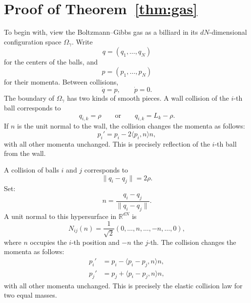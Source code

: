 \documentclass[12pt,reqno]{amsart}
\numberwithin{equation}{section}
\def \R {\mathbb{R}}
\begin{document}
\section{Proof of Theorem~\ref{thm:gas}}
To begin with, view the Boltzmann--Gibbs gas as a billiard in its
\(dN\)-dimensional configuration space \(\Omega_\gamma\). Write
\[
q=(q_1,\ldots,q_N)
\]
for the centers of the balls, and
\[
p=(p_1,\ldots,p_N)
\]
for their momenta. Between collisions,
\[
\dot q=p,\qquad \dot p=0.
\]
The boundary of \(\Omega_\gamma\) has two kinds of smooth pieces. A wall
collision of the \(i\)-th ball corresponds to
\[
q_{i,k}=\rho
\qquad\text{or}\qquad
q_{i,k}=L_k-\rho.
\]
If \(n\) is the unit normal to the wall, 
the collision changes the
momenta as follows:
\[
p_i'=p_i-2\langle p_i,n\rangle n,
\]
with all other momenta unchanged. This is precisely reflection of the
\(i\)-th ball from the wall.
\smallskip%

A collision of balls \(i\) and \(j\) corresponds to
\[
\|q_i-q_j\|=2\rho.
\]
Set:
\[
n=\frac{q_i-q_j}{\|q_i-q_j\|}.
\]
A unit normal to this hypersurface in \(\R^{dN}\) is
\[
N_{ij}(n)
=
\frac1{\sqrt2}
(0,\ldots,n,\ldots,-n,\ldots,0),
\]
where \(n\) occupies the \(i\)-th position and \(-n\) 
the \(j\)-th. The collision changes the
momenta as follows:
\[
\begin{aligned}
p_i'&=p_i-\langle p_i-p_j,n\rangle n,\\
p_j'&=p_j+\langle p_i-p_j,n\rangle n,
\end{aligned}
\]
with all other momenta unchanged. This is precisely the elastic collision
law for two equal masses.
\smallskip%
\end{document}
